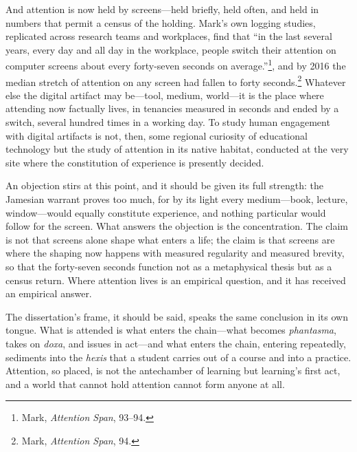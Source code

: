 \documentclass{article}
\begin{document}
And attention is now held by screens---held briefly, held often, and held in numbers that permit a census of the holding. Mark's own logging studies, replicated across research teams and workplaces, find that ``in the last several years, every day and all day in the workplace, people switch their attention on computer screens about every forty-seven seconds on average.''\footnote{Mark, \textit{Attention Span}, 93--94.}, and by 2016 the median stretch of attention on any screen had fallen to forty seconds.\footnote{Mark, \textit{Attention Span}, 94.} Whatever else the digital artifact may be---tool, medium, world---it is the place where attending now factually lives, in tenancies measured in seconds and ended by a switch, several hundred times in a working day. To study human engagement with digital artifacts is not, then, some regional curiosity of educational technology but the study of attention in its native habitat, conducted at the very site where the constitution of experience is presently decided.

An objection stirs at this point, and it should be given its full strength: the Jamesian warrant proves too much, for by its light every medium---book, lecture, window---would equally constitute experience, and nothing particular would follow for the screen. What answers the objection is the concentration. The claim is not that screens alone shape what enters a life; the claim is that screens are where the shaping now happens with measured regularity and measured brevity, so that the forty-seven seconds function not as a metaphysical thesis but as a census return. Where attention lives is an empirical question, and it has received an empirical answer.

The dissertation's frame, it should be said, speaks the same conclusion in its own tongue. What is attended is what enters the chain---what becomes \textit{phantasma}, takes on \textit{doxa}, and issues in act---and what enters the chain, entering repeatedly, sediments into the \textit{hexis} that a student carries out of a course and into a practice. Attention, so placed, is not the antechamber of learning but learning's first act, and a world that cannot hold attention cannot form anyone at all.
\end{document}
